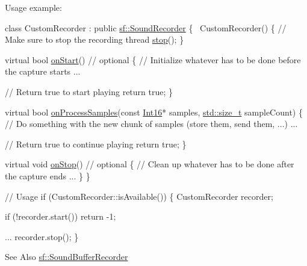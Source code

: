 Usage example\-: 
\begin{DoxyCode}
\textcolor{keyword}{class }CustomRecorder : \textcolor{keyword}{public} \hyperlink{classsf_1_1_sound_recorder}{sf::SoundRecorder}
\{
    ~CustomRecorder()
    \{
        \textcolor{comment}{// Make sure to stop the recording thread}
        \hyperlink{classsf_1_1_sound_recorder_a8d9c8346aa9aa409cfed4a1101159c4c}{stop}();
    \}

    \textcolor{keyword}{virtual} \textcolor{keywordtype}{bool} \hyperlink{classsf_1_1_sound_recorder_a7af418fb036201d3f85745bef78ce77f}{onStart}() \textcolor{comment}{// optional}
    \{
        \textcolor{comment}{// Initialize whatever has to be done before the capture starts}
        ...

        \textcolor{comment}{// Return true to start playing}
        \textcolor{keywordflow}{return} \textcolor{keyword}{true};
    \}

    \textcolor{keyword}{virtual} \textcolor{keywordtype}{bool} \hyperlink{classsf_1_1_sound_recorder_a2670124cbe7a87c7e46b4840807f4fd7}{onProcessSamples}(\textcolor{keyword}{const} \hyperlink{namespacesf_a3c8e10435e2a310a7741755e66b5c94e}{Int16}* samples, 
      \hyperlink{curses_8priv_8h_ae43e1afb4123c6ddee091cf03ec10266}{std::size\_t} sampleCount)
    \{
        \textcolor{comment}{// Do something with the new chunk of samples (store them, send them, ...)}
        ...

        \textcolor{comment}{// Return true to continue playing}
        \textcolor{keywordflow}{return} \textcolor{keyword}{true};
    \}

    \textcolor{keyword}{virtual} \textcolor{keywordtype}{void} \hyperlink{classsf_1_1_sound_recorder_aefc36138ca1e96c658301280e4a31b64}{onStop}() \textcolor{comment}{// optional}
    \{
        \textcolor{comment}{// Clean up whatever has to be done after the capture ends}
        ...
    \}
\}

\textcolor{comment}{// Usage}
\textcolor{keywordflow}{if} (CustomRecorder::isAvailable())
\{
    CustomRecorder recorder;

    \textcolor{keywordflow}{if} (!recorder.start())
        \textcolor{keywordflow}{return} -1;

    ...
    recorder.stop();
\}
\end{DoxyCode}


\begin{DoxySeeAlso}{See Also}
\hyperlink{classsf_1_1_sound_buffer_recorder}{sf\-::\-Sound\-Buffer\-Recorder} 
\end{DoxySeeAlso}


